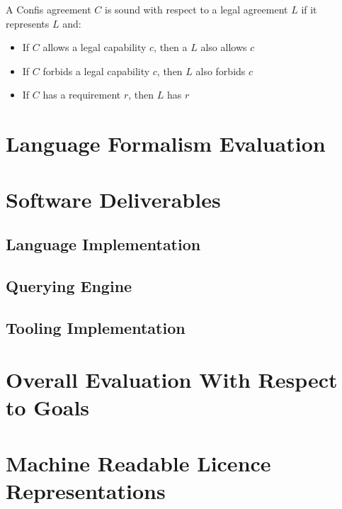 \begin{definition}[Soundness]
    \label{def:soundness}
    A Confis agreement $C$ is sound with respect to a legal agreement $L$ if it represents $L$ and:

    \begin{itemize}
        \item If $C$ allows a legal capability $c$, then a $L$ also allows $c$
        \item If $C$ forbids a legal capability $c$, then $L$ also forbids $c$
        \item If $C$ has a requirement $r$, then $L$ has $r$
    \end{itemize}
\end{definition}

\section{Language Formalism Evaluation}

\section{Software Deliverables}\label{sec:software-deliverables}

\subsection{Language Implementation}

\subsection{Querying Engine}

\subsection{Tooling Implementation}

\section[Overall Evaluation]{Overall Evaluation With Respect to Goals}


\section{Machine Readable Licence Representations}\label{sec:licence-representations}



